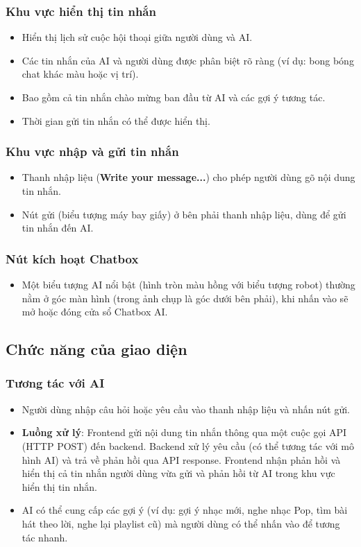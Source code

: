 \documentclass{book}
\begin{document}
\subsubsection{Khu vực hiển thị tin nhắn}
\begin{itemize}
    \item Hiển thị lịch sử cuộc hội thoại giữa người dùng và AI.
    \item Các tin nhắn của AI và người dùng được phân biệt rõ ràng (ví dụ: bong bóng chat khác màu hoặc vị trí).
    \item Bao gồm cả tin nhắn chào mừng ban đầu từ AI và các gợi ý tương tác.
    \item Thời gian gửi tin nhắn có thể được hiển thị.
\end{itemize}

\subsubsection{Khu vực nhập và gửi tin nhắn}
\begin{itemize}
    \item Thanh nhập liệu (\textbf{Write your message...}) cho phép người dùng gõ nội dung tin nhắn.
    \item Nút gửi (biểu tượng máy bay giấy) ở bên phải thanh nhập liệu, dùng để gửi tin nhắn đến AI.
\end{itemize}

\subsubsection{Nút kích hoạt Chatbox}
\begin{itemize}
    \item Một biểu tượng AI nổi bật (hình tròn màu hồng với biểu tượng robot) thường nằm ở góc màn hình (trong ảnh chụp là góc dưới bên phải), khi nhấn vào sẽ mở hoặc đóng cửa sổ Chatbox AI.
\end{itemize}

\subsection{Chức năng của giao diện}

\subsubsection{Tương tác với AI}
\begin{itemize}
    \item Người dùng nhập câu hỏi hoặc yêu cầu vào thanh nhập liệu và nhấn nút gửi.
    \item \textbf{Luồng xử lý}: Frontend gửi nội dung tin nhắn thông qua một cuộc gọi API (HTTP POST) đến backend. Backend xử lý yêu cầu (có thể tương tác với mô hình AI) và trả về phản hồi qua API response. Frontend nhận phản hồi và hiển thị cả tin nhắn người dùng vừa gửi và phản hồi từ AI trong khu vực hiển thị tin nhắn.
    \item AI có thể cung cấp các gợi ý (ví dụ: gợi ý nhạc mới, nghe nhạc Pop, tìm bài hát theo lời, nghe lại playlist cũ) mà người dùng có thể nhấn vào để tương tác nhanh.
\end{itemize}
\end{document}
